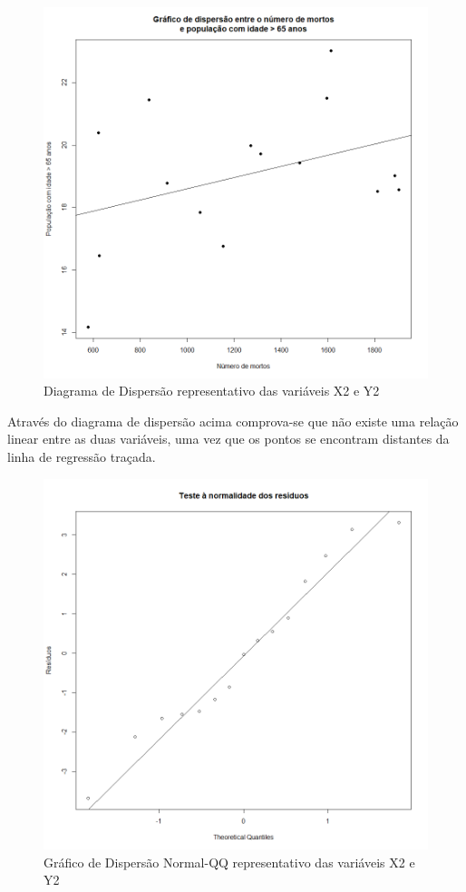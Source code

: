 \documentclass[conference]{IEEEtran}
\begin{document}
\begin{figure}[htbp]
\centerline{\includegraphics[width=0.95\columnwidth]{images/03.b.2.png}}
\caption{Diagrama de Dispersão representativo das variáveis X2 e Y2}
\label{fig}
\end{figure}

Através do diagrama de dispersão acima comprova-se que não existe uma relação linear entre as duas variáveis, uma vez que os pontos se encontram distantes da linha de regressão traçada.

\begin{figure}[htbp]
\centerline{\includegraphics[width=0.95\columnwidth]{images/03.b.3.png}}
\caption{Gráfico de Dispersão Normal-QQ representativo das variáveis X2 e Y2}
\label{fig}
\end{figure}
\end{document}
